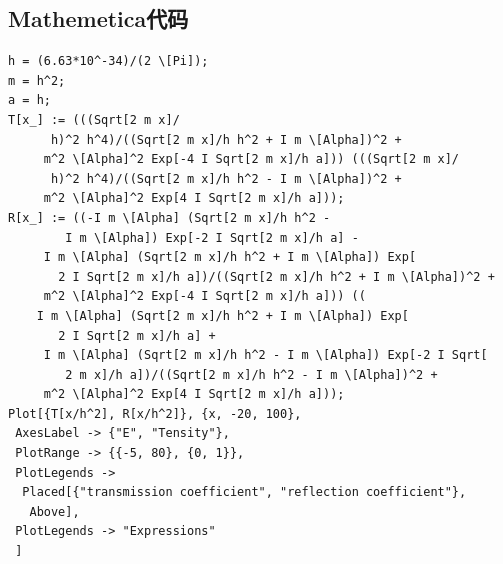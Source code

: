 \documentclass[12pt, a4paper, oneside]{ctexart}
\begin{document}
\begin{spacing}{2.0}
\subsection{Mathemetica代码}
\begin{lstlisting}
h = (6.63*10^-34)/(2 \[Pi]);
m = h^2;
a = h;
T[x_] := (((Sqrt[2 m x]/
      h)^2 h^4)/((Sqrt[2 m x]/h h^2 + I m \[Alpha])^2 + 
     m^2 \[Alpha]^2 Exp[-4 I Sqrt[2 m x]/h a])) (((Sqrt[2 m x]/
      h)^2 h^4)/((Sqrt[2 m x]/h h^2 - I m \[Alpha])^2 + 
     m^2 \[Alpha]^2 Exp[4 I Sqrt[2 m x]/h a]));
R[x_] := ((-I m \[Alpha] (Sqrt[2 m x]/h h^2 - 
        I m \[Alpha]) Exp[-2 I Sqrt[2 m x]/h a] - 
     I m \[Alpha] (Sqrt[2 m x]/h h^2 + I m \[Alpha]) Exp[
       2 I Sqrt[2 m x]/h a])/((Sqrt[2 m x]/h h^2 + I m \[Alpha])^2 + 
     m^2 \[Alpha]^2 Exp[-4 I Sqrt[2 m x]/h a])) ((
    I m \[Alpha] (Sqrt[2 m x]/h h^2 + I m \[Alpha]) Exp[
       2 I Sqrt[2 m x]/h a] + 
     I m \[Alpha] (Sqrt[2 m x]/h h^2 - I m \[Alpha]) Exp[-2 I Sqrt[
        2 m x]/h a])/((Sqrt[2 m x]/h h^2 - I m \[Alpha])^2 + 
     m^2 \[Alpha]^2 Exp[4 I Sqrt[2 m x]/h a]));
Plot[{T[x/h^2], R[x/h^2]}, {x, -20, 100},
 AxesLabel -> {"E", "Tensity"},
 PlotRange -> {{-5, 80}, {0, 1}},
 PlotLegends -> 
  Placed[{"transmission coefficient", "reflection coefficient"}, 
   Above],
 PlotLegends -> "Expressions"
 ]
\end{lstlisting}

\end{spacing}



\end{document}
